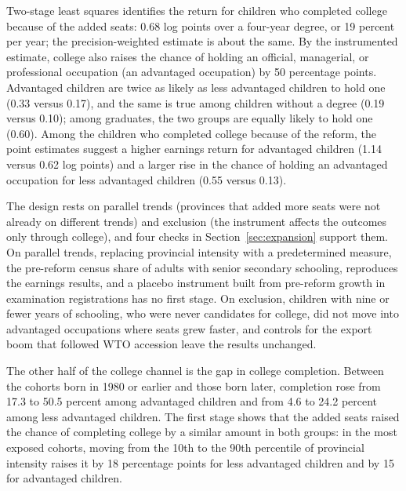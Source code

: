 \documentclass[11pt]{article}
\begin{document}
Two-stage least squares identifies the return for children who completed college because of the added seats: 0.68 log points over a four-year degree, or 19 percent per year; the precision-weighted estimate is about the same. By the instrumented estimate, college also raises the chance of holding an official, managerial, or professional occupation (an advantaged occupation) by 50 percentage points. Advantaged children are twice as likely as less advantaged children to hold one (0.33 versus 0.17), and the same is true among children without a degree (0.19 versus 0.10); among graduates, the two groups are equally likely to hold one (0.60). Among the children who completed college because of the reform, the point estimates suggest a higher earnings return for advantaged children (1.14 versus 0.62 log points) and a larger rise in the chance of holding an advantaged occupation for less advantaged children (0.55 versus 0.13).

The design rests on parallel trends (provinces that added more seats were not already on different trends) and exclusion (the instrument affects the outcomes only through college), and four checks in Section~\ref{sec:expansion} support them. On parallel trends, replacing provincial intensity with a predetermined measure, the pre-reform census share of adults with senior secondary schooling, reproduces the earnings results, and a placebo instrument built from pre-reform growth in examination registrations has no first stage. On exclusion, children with nine or fewer years of schooling, who were never candidates for college, did not move into advantaged occupations where seats grew faster, and controls for the export boom that followed WTO accession leave the results unchanged.

The other half of the college channel is the gap in college completion. Between the cohorts born in 1980 or earlier and those born later, completion rose from 17.3 to 50.5 percent among advantaged children and from 4.6 to 24.2 percent among less advantaged children. The first stage shows that the added seats raised the chance of completing college by a similar amount in both groups: in the most exposed cohorts, moving from the 10th to the 90th percentile of provincial intensity raises it by 18 percentage points for less advantaged children and by 15 for advantaged children.
\end{document}
